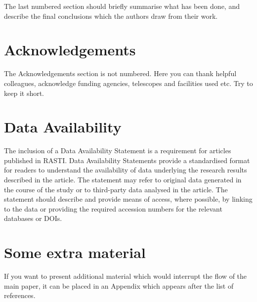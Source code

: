\documentclass[fleqn,usenatbib]{rasti}
\begin{document}
The last numbered section should briefly summarise what has been done, and describe
the final conclusions which the authors draw from their work.

\section*{Acknowledgements}

The Acknowledgements section is not numbered. Here you can thank helpful
colleagues, acknowledge funding agencies, telescopes and facilities used etc.
Try to keep it short.

\section*{Data Availability}

 
The inclusion of a Data Availability Statement is a requirement for articles published in RASTI. Data Availability Statements provide a standardised format for readers to understand the availability of data underlying the research results described in the article. The statement may refer to original data generated in the course of the study or to third-party data analysed in the article. The statement should describe and provide means of access, where possible, by linking to the data or providing the required accession numbers for the relevant databases or DOIs.












\appendix

\section{Some extra material}

If you want to present additional material which would interrupt the flow of the main paper,
it can be placed in an Appendix which appears after the list of references.



\bsp	%
\label{lastpage}
\end{document}
